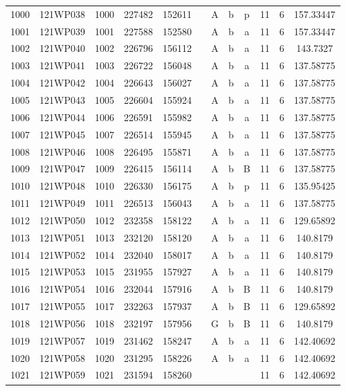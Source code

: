 \begin{tabular}{|*{12}{c|}}
1000 & 121WP038 & 1000 & 227482 & 152611 &  & A & b & p & 11 & 6 & 157.33447 \\ 
1001 & 121WP039 & 1001 & 227588 & 152580 &  & A & b & a & 11 & 6 & 157.33447 \\ 
1002 & 121WP040 & 1002 & 226796 & 156112 &  & A & b & a & 11 & 6 & 143.7327 \\ 
1003 & 121WP041 & 1003 & 226722 & 156048 &  & A & b & a & 11 & 6 & 137.58775 \\ 
1004 & 121WP042 & 1004 & 226643 & 156027 &  & A & b & a & 11 & 6 & 137.58775 \\ 
1005 & 121WP043 & 1005 & 226604 & 155924 &  & A & b & a & 11 & 6 & 137.58775 \\ 
1006 & 121WP044 & 1006 & 226591 & 155982 &  & A & b & a & 11 & 6 & 137.58775 \\ 
1007 & 121WP045 & 1007 & 226514 & 155945 &  & A & b & a & 11 & 6 & 137.58775 \\ 
1008 & 121WP046 & 1008 & 226495 & 155871 &  & A & b & a & 11 & 6 & 137.58775 \\ 
1009 & 121WP047 & 1009 & 226415 & 156114 &  & A & b & B & 11 & 6 & 137.58775 \\ 
1010 & 121WP048 & 1010 & 226330 & 156175 &  & A & b & p & 11 & 6 & 135.95425 \\ 
1011 & 121WP049 & 1011 & 226513 & 156043 &  & A & b & a & 11 & 6 & 137.58775 \\ 
1012 & 121WP050 & 1012 & 232358 & 158122 &  & A & b & a & 11 & 6 & 129.65892 \\ 
1013 & 121WP051 & 1013 & 232120 & 158120 &  & A & b & a & 11 & 6 & 140.8179 \\ 
1014 & 121WP052 & 1014 & 232040 & 158017 &  & A & b & a & 11 & 6 & 140.8179 \\ 
1015 & 121WP053 & 1015 & 231955 & 157927 &  & A & b & a & 11 & 6 & 140.8179 \\ 
1016 & 121WP054 & 1016 & 232044 & 157916 &  & A & b & B & 11 & 6 & 140.8179 \\ 
1017 & 121WP055 & 1017 & 232263 & 157937 &  & A & b & B & 11 & 6 & 129.65892 \\ 
1018 & 121WP056 & 1018 & 232197 & 157956 &  & G & b & B & 11 & 6 & 140.8179 \\ 
1019 & 121WP057 & 1019 & 231462 & 158247 &  & A & b & a & 11 & 6 & 142.40692 \\ 
1020 & 121WP058 & 1020 & 231295 & 158226 &  & A & b & a & 11 & 6 & 142.40692 \\ 
1021 & 121WP059 & 1021 & 231594 & 158260 &  &  &  &  & 11 & 6 & 142.40692 \\ 

\end{tabular}
